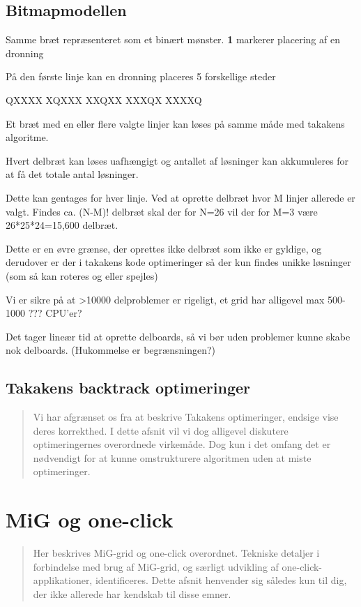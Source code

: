 \documentclass[a4,10pt]{article}
\begin{document}
\subsection{Bitmapmodellen}\label{bitmapmodellen}

Samme bræt repræsenteret som et binært mønster. \textbf{1} markerer  placering af en dronning





På den første linje kan en dronning placeres 5 forskellige steder



QXXXX
XQXXX
XXQXX
XXXQX
XXXXQ


Et bræt med en eller flere valgte linjer kan løses på samme måde med takakens algoritme.

Hvert delbræt kan løses uafhængigt og antallet af løsninger kan akkumuleres for at få det totale antal løsninger.


Dette kan gentages for hver linje. Ved at oprette delbræt hvor M linjer allerede er valgt. Findes ca. (N-M)! delbræt skal der for N=26 vil der for M=3 være 26*25*24=15,600 delbræt.

Dette er en øvre grænse, der oprettes ikke delbræt som ikke er gyldige, og derudover er der i takakens kode optimeringer så der kun findes unikke løsninger (som så kan roteres og eller spejles)


Vi er sikre på at >10000 delproblemer er rigeligt, et grid har alligevel max 500-1000 ??? CPU'er?

Det tager lineær tid at oprette delboards, så vi bør uden problemer kunne skabe nok delboards. (Hukommelse er begrænsningen?)



\subsection{Takakens backtrack optimeringer}\label{backtrackoptimeringer}
\begin{verse}
	Vi har afgrænset os fra at beskrive Takakens optimeringer, endsige vise deres korrekthed. I dette afsnit vil vi dog alligevel diskutere optimeringernes overordnede virkemåde. Dog kun i det omfang det er nødvendigt for at kunne omstrukturere algoritmen uden at miste optimeringer.   
\end{verse}




\section{MiG og one-click}\label{migogoneclick}
\begin{verse}
	Her beskrives MiG-grid og one-click overordnet. Tekniske detaljer i forbindelse med brug af MiG-grid, og særligt udvikling af one-click-applikationer, identificeres. Dette afsnit henvender sig således kun til dig, der ikke allerede har kendskab til disse emner.  
\end{verse}
\end{document}
